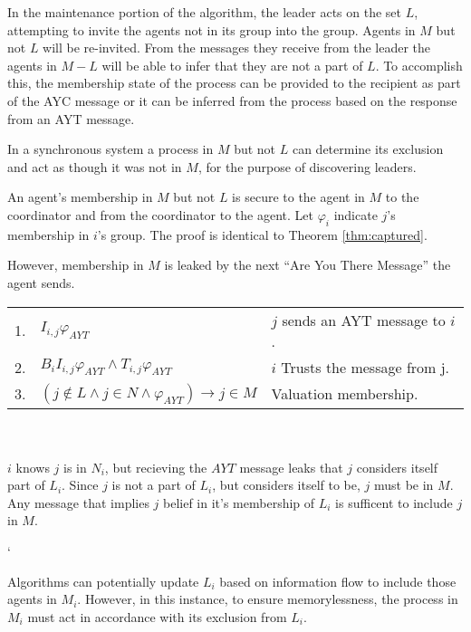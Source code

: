 In the maintenance portion of the algorithm, the leader acts on the set $L$, attempting to invite the agents not in its group into the group. Agents in $M$ but not $L$ will be re-invited. From the messages they receive from the leader the agents in $M-L$ will be able to infer that they are not a part of $L$. To accomplish this, the membership state of the process can be provided to the recipient as part of the \ac{AYC} message or it can be inferred from the process based on the response from an \ac{AYT} message. 

\begin{thm}
In a synchronous system a process in $M$ but not $L$ can determine its exclusion and act as though it was not in $M$, for the purpose of discovering leaders.
\end{thm}

An agent's membership in $M$ but not $L$ is secure to the agent in $M$ to the coordinator and from the coordinator to the agent. Let $\varphi_i$ indicate $j$'s membership in $i$'s group. The proof is identical to Theorem \ref{thm:captured}.

However, membership in $M$ is leaked by the next ``Are You There Message'' the agent sends.

\begin{table}[h!]
\centering
\small
\begin{tabularx}{\linewidth}{l X X}
1. & $I_{i,j} \varphi_{AYT}$ & $j$ sends an AYT message to $i$. \\
2. & $B_i I_{i,j} \varphi_{AYT} \wedge T_{i,j} \varphi_{AYT}$ & $i$ Trusts the message from j. \\
3. & $(j \not \in L \wedge j \in N \wedge \varphi_{AYT}) \rightarrow j \in M $ & Valuation membership. \\ 
\end{tabularx} \\~\\
$i$ knows $j$ is in $N_i$, but recieving the $AYT$ message leaks that $j$ considers itself part of $L_i$. Since $j$ is not a part of $L_i$, but considers itself to be, $j$ must be in $M$. Any message that implies $j$ belief in it's membership of $L_i$ is sufficent to include $j$ in $M$.
\end{table}`

Algorithms can potentially update $L_i$ based on information flow to include those agents in $M_i$.
However, in this instance, to ensure memorylessness, the process in $M_i$ must act in accordance with its exclusion from $L_i$.

